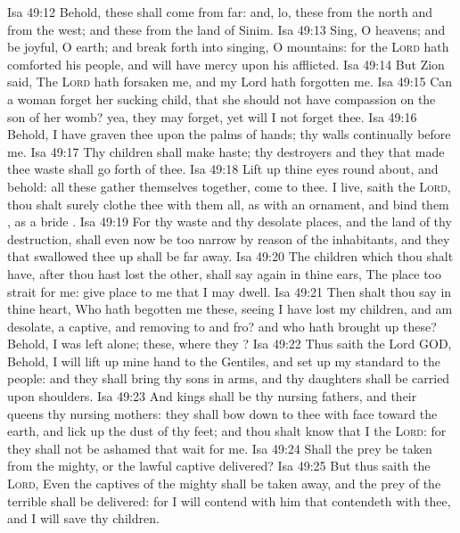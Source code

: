 \vs Isa 49:12 Behold, these shall come from far: and, lo, these from the north and from the west; and these from the land of Sinim.
\vs Isa 49:13 Sing, O heavens; and be joyful, O earth; and break forth into singing, O mountains: for the \textsc{Lord} hath comforted his people, and will have mercy upon his afflicted.
\vs Isa 49:14 But Zion said, The \textsc{Lord} hath forsaken me, and my Lord hath forgotten me.
\vs Isa 49:15 Can a woman forget her sucking child, that she should not have compassion on the son of her womb? yea, they may forget, yet will I not forget thee.
\vs Isa 49:16 Behold, I have graven thee upon the palms of  hands; thy walls  continually before me.
\vs Isa 49:17 Thy children shall make haste; thy destroyers and they that made thee waste shall go forth of thee.
\vs Isa 49:18 Lift up thine eyes round about, and behold: all these gather themselves together,  come to thee.  I live, saith the \textsc{Lord}, thou shalt surely clothe thee with them all, as with an ornament, and bind them , as a bride .
\vs Isa 49:19 For thy waste and thy desolate places, and the land of thy destruction, shall even now be too narrow by reason of the inhabitants, and they that swallowed thee up shall be far away.
\vs Isa 49:20 The children which thou shalt have, after thou hast lost the other, shall say again in thine ears, The place  too strait for me: give place to me that I may dwell.
\vs Isa 49:21 Then shalt thou say in thine heart, Who hath begotten me these, seeing I have lost my children, and am desolate, a captive, and removing to and fro? and who hath brought up these? Behold, I was left alone; these, where  they ?
\vs Isa 49:22 Thus saith the Lord GOD, Behold, I will lift up mine hand to the Gentiles, and set up my standard to the people: and they shall bring thy sons in  arms, and thy daughters shall be carried upon  shoulders.
\vs Isa 49:23 And kings shall be thy nursing fathers, and their queens thy nursing mothers: they shall bow down to thee with  face toward the earth, and lick up the dust of thy feet; and thou shalt know that I  the \textsc{Lord}: for they shall not be ashamed that wait for me.
\vs Isa 49:24 Shall the prey be taken from the mighty, or the lawful captive delivered?
\vs Isa 49:25 But thus saith the \textsc{Lord}, Even the captives of the mighty shall be taken away, and the prey of the terrible shall be delivered: for I will contend with him that contendeth with thee, and I will save thy children.
